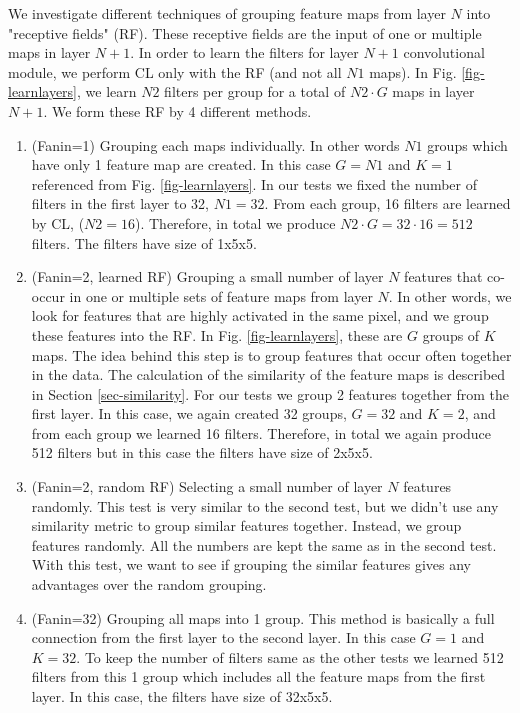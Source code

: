 \documentclass{article} %
\begin{document}
We investigate  different techniques of grouping feature maps from layer $N$ into "receptive fields" (RF). These receptive fields 
are the input of one or multiple maps in layer $N+1$. In order to learn the filters for layer $N+1$ convolutional module, we 
perform CL only with the RF (and not all $N1$ maps). In Fig. \ref{fig-learnlayers}, we learn $N2$ filters per group for a total of 
$N2 \cdot G$ maps in layer $N+1$.
We form these RF by 4 different methods. 
\begin{enumerate}
\item (Fanin=1) Grouping each maps individually. In other words $N1$ groups which have only 1 feature map are created. In this case $G = N1$ and $K = 1$ referenced 
 from Fig. \ref{fig-learnlayers}. In our tests we fixed the number of filters in the first layer to 32, $N1=32$. 
 From each group, 16 filters are learned by CL, ($N2 = 16$). Therefore, in total we produce $N2 \cdot G = 32 \cdot 16 = 512$ filters. 
 The filters have size of 1x5x5. 
 \item (Fanin=2, learned RF) Grouping a small number of layer $N$ features that co-occur in one or multiple sets of feature maps from layer $N$. 
 In other words, we look for features that are highly activated in the same pixel, and we group these features into the RF.
  In Fig. \ref{fig-learnlayers}, these are $G$ groups of $K$ maps. The idea behind this step is to group features that occur 
  often together in the data. The calculation of the similarity of the feature maps is described in Section \ref{sec-similarity}.
  For our tests we group 2 features together from the first layer. In this case, we again created 32  groups, $G = 32$ and $K = 2$,
  and from each group we learned 16 filters. Therefore, in total we again produce 512 filters but in this case the filters have size 
  of 2x5x5. 
\item (Fanin=2, random RF) Selecting a small number of layer $N$ features randomly. This test is very similar to the second test, but we didn't 
use any similarity metric to group similar features together. Instead, we group features randomly. All the numbers are kept the same as in 
the second test. With this test, we want to see if grouping the similar features gives any advantages over the random grouping.
\item (Fanin=32) Grouping all maps into 1 group. This method is basically a full connection from the first layer to the second layer. 
In this case $G = 1$ and $K = 32$. To keep the number of filters same as the other tests we learned 512 filters from this 
1 group which includes all the feature maps from the first layer. In this case,  the filters have size of 32x5x5. 


\end{enumerate}
\end{document}
